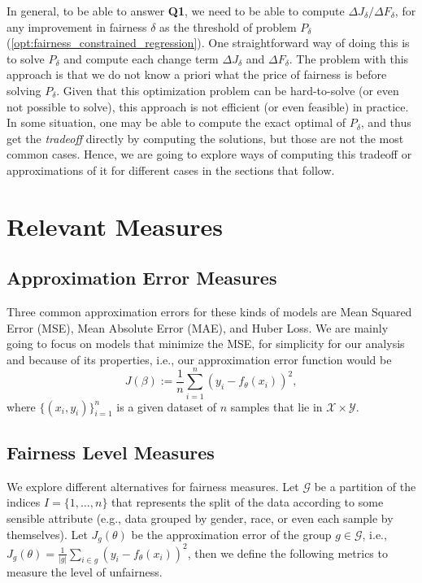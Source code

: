 \documentclass[11pt]{article}
\theoremstyle{plain}
\theoremstyle{definition}
\newcommand{\1}{\mathbf{1}}
\newcommand{\Y}{\mathcal{Y}}
\newcommand{\X}{\mathcal{X}}
\newcommand{\G}{\mathcal{G}}
\begin{document}
In general, to be able to answer \textbf{Q1}, we need to be able to compute $\Delta J_\delta / \Delta F_\delta$, for any improvement in fairness $\delta$ as the threshold of problem $P_\delta$ (\ref{opt:fairness_constrained_regression}). One straightforward way of doing this is to solve $P_\delta$ and compute each change term $\Delta J_\delta$ and $\Delta F_\delta$. The problem with this approach is that we do not know a priori what the price of fairness is before solving $P_\delta$. Given that this optimization problem can be hard-to-solve (or even not possible to solve), this approach is not efficient (or even feasible) in practice. In some situation, one may be able to compute the exact optimal of $P_\delta$, and thus get the \textit{tradeoff} directly by computing the solutions, but those are not the most common cases. Hence, we are going to explore ways of computing this tradeoff or approximations of it for different cases in the sections that follow.


\section{Relevant Measures}

\subsection{Approximation Error Measures}

Three common approximation errors for these kinds of models are Mean Squared Error (MSE), Mean Absolute Error (MAE), and Huber Loss. We are mainly going to focus on models that minimize the MSE, for simplicity for our analysis and because of its properties, i.e., our approximation error function would be $$J(\beta):=\frac{1}{n}\sum_{i=1}^n(y_i-f_\theta(x_i))^2,$$ where $\{(x_i, y_i)\}_{i=1}^n$ is a given dataset of $n$ samples that lie in $\X\times \Y$.

\subsection{Fairness Level Measures}


We explore different alternatives for fairness measures. Let $\G$ be a partition of the indices $I = \{1,\ldots,n\}$ that represents the split of the data according to some sensible attribute (e.g., data grouped by gender, race, or even each sample by themselves). Let $J_g(\theta)$ be the approximation error of the group $g\in \G$, i.e., $J_g(\theta)=\frac{1}{|g|}\sum_{i\in g}(y_i - f_\theta(x_i))^2$, then we define the following metrics to measure the level of unfairness.
\end{document}
